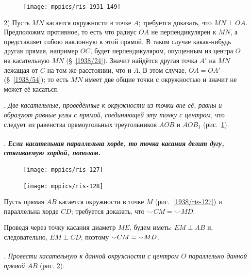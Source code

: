 \documentclass[twoside]{book}
\begin{document}
\begin{figure}
\centering
\texttt{[image: mppics/ris-1931-149]}
\caption{}\label{1931/ris-149}
\end{figure}

2) Пусть $MN$ касается окружности в точке $A$; требуется доказать, что $MN\perp OA$.
Предположим противное, то есть что радиус $OA$ не перпендикулярен к $MN$, а представляет собою наклонную к этой прямой.
В таком случае какая-нибудь другая прямая, например $OC$, будет перпендикуляром, опущенным из центра $O$ на касательную $MN$ (§~\ref{1938/24}).
Значит найдётся другая точка $A'$ на $MN$ лежащая от $C$ на том же расстоянии, что и $A$.
В этом случае, $OA=OA'$ (§~\ref{1938/54});
то есть $MN$ имеет две общие точки с окружностью и значит не может её касаться.

\smallskip
\mbox{.}
\emph{Две касательные, проведённые к окружности из точки вне её, равны и образуют равные углы с прямой, соединяющей эту точку с центром,} что следует из равенства прямоугольных треугольников $AOB$ и $AOB_1$ (рис.~\ref{1931/ris-149}).

\paragraph{}\label{1938/114}
\mbox{.}
\textbf{\emph{Если касательная параллельна хорде, то точка касания делит дугу, стягиваемую хордой, пополам.}}

\begin{figure}
\centering
\texttt{[image: mppics/ris-127]}
\caption{}\label{1938/ris-127}
\bigskip
\texttt{[image: mppics/ris-128]}
\caption{}\label{1938/ris-128}
\end{figure}

Пусть прямая $AB$ касается окружности в точке $M$ (рис.~\ref{1938/ris-127}) и параллельна хорде $CD$;
требуется доказать, что ${\smallsmile}CM={\smallsmile}MD$.

Проведя через точку касания диаметр $ME$, будем иметь:
$EM\perp AB$ и, следовательно, $EM\perp CD$;
поэтому ${\smallsmile}CM\z={\smallsmile}MD$.

\paragraph{}\label{1938/115}
\mbox{.}
\emph{Провести касательную к данной окружности с центром $O$ параллельно данной прямой $AB$} (рис. \ref{1938/ris-128}).
\end{document}
